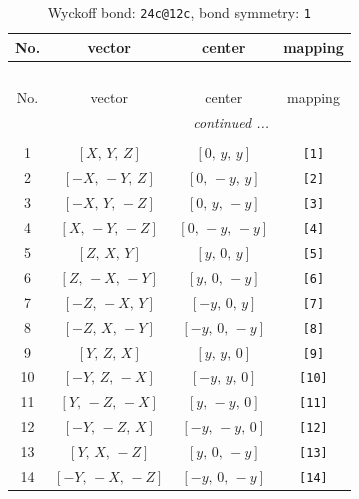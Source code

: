 \documentclass[fleqn,8pt]{jsarticle}
\begin{document}
\begin{longtable}{cccc}
\caption{Wyckoff bond: {\tt 24c@12c}, bond symmetry: {\tt 1}}
 \\
 \hline \hline
No. & vector & center & mapping \\ \hline \endfirsthead

\multicolumn{3}{l}{\tablename\ \thetable{}} \\
 \hline \hline
No. & vector & center & mapping \\ \hline \endhead

 \hline \hline
\multicolumn{3}{r}{\footnotesize\it continued ...} \\ \endfoot

 \hline \hline
\multicolumn{3}{r}{} \\ \endlastfoot

1 & $\left[ X,\, Y,\, Z \right]$ & $\left[ 0,\, y,\, y \right]$ & {\tt [1]} \\ \hline
2 & $\left[ - X,\, - Y,\, Z \right]$ & $\left[ 0,\, - y,\, y \right]$ & {\tt [2]} \\ \hline
3 & $\left[ - X,\, Y,\, - Z \right]$ & $\left[ 0,\, y,\, - y \right]$ & {\tt [3]} \\ \hline
4 & $\left[ X,\, - Y,\, - Z \right]$ & $\left[ 0,\, - y,\, - y \right]$ & {\tt [4]} \\ \hline
5 & $\left[ Z,\, X,\, Y \right]$ & $\left[ y,\, 0,\, y \right]$ & {\tt [5]} \\ \hline
6 & $\left[ Z,\, - X,\, - Y \right]$ & $\left[ y,\, 0,\, - y \right]$ & {\tt [6]} \\ \hline
7 & $\left[ - Z,\, - X,\, Y \right]$ & $\left[ - y,\, 0,\, y \right]$ & {\tt [7]} \\ \hline
8 & $\left[ - Z,\, X,\, - Y \right]$ & $\left[ - y,\, 0,\, - y \right]$ & {\tt [8]} \\ \hline
9 & $\left[ Y,\, Z,\, X \right]$ & $\left[ y,\, y,\, 0 \right]$ & {\tt [9]} \\ \hline
10 & $\left[ - Y,\, Z,\, - X \right]$ & $\left[ - y,\, y,\, 0 \right]$ & {\tt [10]} \\ \hline
11 & $\left[ Y,\, - Z,\, - X \right]$ & $\left[ y,\, - y,\, 0 \right]$ & {\tt [11]} \\ \hline
12 & $\left[ - Y,\, - Z,\, X \right]$ & $\left[ - y,\, - y,\, 0 \right]$ & {\tt [12]} \\ \hline
13 & $\left[ Y,\, X,\, - Z \right]$ & $\left[ y,\, 0,\, - y \right]$ & {\tt [13]} \\ \hline
14 & $\left[ - Y,\, - X,\, - Z \right]$ & $\left[ - y,\, 0,\, - y \right]$ & {\tt [14]} \\ \hline

\end{longtable}
\end{document}
